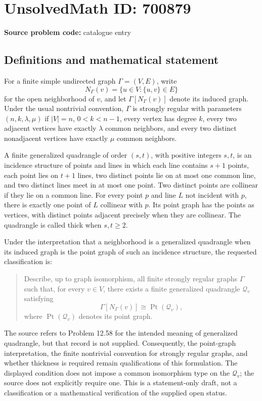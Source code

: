 \documentclass[11pt]{article}
\begin{document}
\section*{UnsolvedMath ID: 700879}
\textbf{Source problem code:} catalogue entry
\subsection{Definitions and mathematical statement}
For a finite simple undirected graph \(\Gamma=(V,E)\), write
\[
N_\Gamma(v)=\{u\in V:\{u,v\}\in E\}
\]
for the open neighborhood of \(v\), and let \(\Gamma[N_\Gamma(v)]\) denote its induced graph. Under the usual nontrivial convention, \(\Gamma\) is strongly regular with parameters \((n,k,\lambda,\mu)\) if \(|V|=n\), \(0<k<n-1\), every vertex has degree \(k\), every two adjacent vertices have exactly \(\lambda\) common neighbors, and every two distinct nonadjacent vertices have exactly \(\mu\) common neighbors.

A finite generalized quadrangle of order \((s,t)\), with positive integers \(s,t\), is an incidence structure of points and lines in which each line contains \(s+1\) points, each point lies on \(t+1\) lines, two distinct points lie on at most one common line, and two distinct lines meet in at most one point. Two distinct points are collinear if they lie on a common line. For every point \(p\) and line \(L\) not incident with \(p\), there is exactly one point of \(L\) collinear with \(p\). Its point graph has the points as vertices, with distinct points adjacent precisely when they are collinear. The quadrangle is called thick when \(s,t\geq 2\).

Under the interpretation that a neighborhood is a generalized quadrangle when its induced graph is the point graph of such an incidence structure, the requested classification is:
\begin{quote}
Describe, up to graph isomorphism, all finite strongly regular graphs \(\Gamma\) such that, for every \(v\in V\), there exists a finite generalized quadrangle \(\mathcal Q_v\) satisfying
\[
\Gamma[N_\Gamma(v)]\cong \operatorname{Pt}(\mathcal Q_v),
\]
where \(\operatorname{Pt}(\mathcal Q_v)\) denotes its point graph.
\end{quote}
The source refers to Problem 12.58 for the intended meaning of generalized quadrangle, but that record is not supplied. Consequently, the point-graph interpretation, the finite nontrivial convention for strongly regular graphs, and whether thickness is required remain qualifications of this formulation. The displayed condition does not impose a common isomorphism type on the \(\mathcal Q_v\); the source does not explicitly require one. This is a statement-only draft, not a classification or a mathematical verification of the supplied open status.
\end{document}

